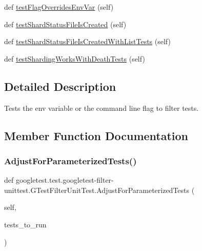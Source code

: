 \begin{DoxyCompactItemize}
\item 
def \mbox{\hyperlink{classgoogletest_1_1test_1_1googletest-filter-unittest_1_1_g_test_filter_unit_test_a71651abc32a3fa43acd8e71a3eda8434}{test\+Flag\+Overrides\+Env\+Var}} (self)
\item 
def \mbox{\hyperlink{classgoogletest_1_1test_1_1googletest-filter-unittest_1_1_g_test_filter_unit_test_a28a3f6c9a24e9afe7a7a8b8b954533fc}{test\+Shard\+Status\+File\+Is\+Created}} (self)
\item 
def \mbox{\hyperlink{classgoogletest_1_1test_1_1googletest-filter-unittest_1_1_g_test_filter_unit_test_a2edb275318d8c7f9bf540b83e198a84a}{test\+Shard\+Status\+File\+Is\+Created\+With\+List\+Tests}} (self)
\item 
def \mbox{\hyperlink{classgoogletest_1_1test_1_1googletest-filter-unittest_1_1_g_test_filter_unit_test_af25776980feaf762e9fe323b98101406}{test\+Sharding\+Works\+With\+Death\+Tests}} (self)
\end{DoxyCompactItemize}


\subsection{Detailed Description}
\begin{DoxyVerb}Tests the env variable or the command line flag to filter tests.\end{DoxyVerb}
 

\subsection{Member Function Documentation}
\mbox{\label{classgoogletest_1_1test_1_1googletest-filter-unittest_1_1_g_test_filter_unit_test_a2ab2fdfe1a6e2e90865a47ec8504af62}} 
\subsubsection{\texorpdfstring{AdjustForParameterizedTests()}{AdjustForParameterizedTests()}}
{\footnotesize\ttfamily def googletest.\+test.\+googletest-\/filter-\/unittest.\+G\+Test\+Filter\+Unit\+Test.\+Adjust\+For\+Parameterized\+Tests (\begin{DoxyParamCaption}\item[{}]{self,  }\item[{}]{tests\+\_\+to\+\_\+run }\end{DoxyParamCaption})}

